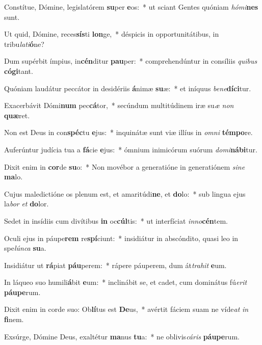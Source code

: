 \item Constítue, Dómine, legislatórem \textbf{su}per \textbf{e}os:~* ut sciant Gentes quóniam \textit{hó}\textit{mi}\textbf{nes} sunt.
\item Ut quid, Dómine, reces\textbf{sís}ti \textbf{lon}ge,~* déspicis in opportunitátibus, in tribu\textit{la}\textit{ti}\textbf{ó}ne?
\item Dum supérbit ímpius, in\textbf{cén}ditur \textbf{pau}per:~* comprehendúntur in consíliis \textit{qui}\textit{bus} \textbf{có}\textbf{gi}tant.
\item Quóniam laudátur peccátor in desidériis \textbf{á}nimæ \textbf{su}æ:~* et iníquus \textit{be}\textit{ne}\textbf{dí}\textbf{ci}tur.
\item Exacerbávit Dómi\textbf{num} pec\textbf{cá}tor,~* secúndum multitúdinem iræ su\textit{æ} \textit{non} \textbf{quæ}ret.
\item Non est Deus in con\textbf{spéc}tu \textbf{e}jus:~* inquinátæ sunt viæ illíus in \textit{om}\textit{ni} \textbf{tém}\textbf{po}re.
\item Auferúntur judícia tua a \textbf{fá}cie \textbf{e}jus:~* ómnium inimicórum suórum \textit{do}\textit{mi}\textbf{ná}\textbf{bi}tur.
\item Dixit enim in \textbf{cor}de \textbf{su}o:~* Non movébor a generatióne in generatiónem \textit{si}\textit{ne} \textbf{ma}lo.
\item Cujus maledictióne os plenum est, et amaritúdi\textbf{ne}, et \textbf{do}lo:~* sub lingua ejus la\textit{bor} \textit{et} \textbf{do}lor.
\item Sedet in insídiis cum divítibus \textbf{in} oc\textbf{cúl}tis:~* ut interfíciat \textit{in}\textit{no}\textbf{cén}tem.
\item Oculi ejus in páupe\textbf{rem} re\textbf{spí}ciunt:~* insidiátur in abscóndito, quasi leo in spe\textit{lún}\textit{ca} \textbf{su}a.
\item Insidiátur ut \textbf{rá}piat \textbf{páu}perem:~* rápere páuperem, dum át\textit{tra}\textit{hit} \textbf{e}um.
\item In láqueo suo humili\textbf{á}bit \textbf{e}um:~* inclinábit se, et cadet, cum dominátus fú\textit{e}\textit{rit} \textbf{páu}\textbf{pe}rum.
\item Dixit enim in corde suo: Ob\textbf{lí}tus est \textbf{De}us,~* avértit fáciem suam ne víde\textit{at} \textit{in} \textbf{fi}nem.
\item Exsúrge, Dómine Deus, exaltétur \textbf{ma}nus \textbf{tu}a:~* ne oblivis\textit{cá}\textit{ris} \textbf{páu}\textbf{pe}rum.
